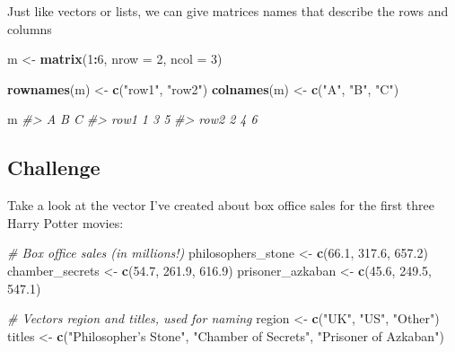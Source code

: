 \documentclass[]{book}
\newenvironment{Shaded}{\begin{snugshade}}{\end{snugshade}}
\newcommand{\KeywordTok}[1]{\textcolor[rgb]{0.13,0.29,0.53}{\textbf{#1}}}
\newcommand{\DataTypeTok}[1]{\textcolor[rgb]{0.13,0.29,0.53}{#1}}
\newcommand{\DecValTok}[1]{\textcolor[rgb]{0.00,0.00,0.81}{#1}}
\newcommand{\FloatTok}[1]{\textcolor[rgb]{0.00,0.00,0.81}{#1}}
\newcommand{\StringTok}[1]{\textcolor[rgb]{0.31,0.60,0.02}{#1}}
\newcommand{\CommentTok}[1]{\textcolor[rgb]{0.56,0.35,0.01}{\textit{#1}}}
\newcommand{\OperatorTok}[1]{\textcolor[rgb]{0.81,0.36,0.00}{\textbf{#1}}}
\newcommand{\NormalTok}[1]{#1}
\begin{document}
Just like vectors or lists, we can give matrices names that describe the
rows and columns

\begin{Shaded}
\begin{Highlighting}[]
\NormalTok{m <-}\StringTok{ }\KeywordTok{matrix}\NormalTok{(}\DecValTok{1}\OperatorTok{:}\DecValTok{6}\NormalTok{, }\DataTypeTok{nrow =} \DecValTok{2}\NormalTok{, }\DataTypeTok{ncol =} \DecValTok{3}\NormalTok{)}

\KeywordTok{rownames}\NormalTok{(m) <-}\StringTok{ }\KeywordTok{c}\NormalTok{(}\StringTok{"row1"}\NormalTok{, }\StringTok{"row2"}\NormalTok{)}
\KeywordTok{colnames}\NormalTok{(m) <-}\StringTok{ }\KeywordTok{c}\NormalTok{(}\StringTok{"A"}\NormalTok{, }\StringTok{"B"}\NormalTok{, }\StringTok{"C"}\NormalTok{)}

\NormalTok{m}
\CommentTok{#>      A B C}
\CommentTok{#> row1 1 3 5}
\CommentTok{#> row2 2 4 6}
\end{Highlighting}
\end{Shaded}

\subsection{Challenge}\label{challenge}

Take a look at the vector I've created about box office sales for the
first three Harry Potter movies:

\begin{Shaded}
\begin{Highlighting}[]
\CommentTok{# Box office sales (in millions!)}
\NormalTok{philosophers_stone <-}\StringTok{ }\KeywordTok{c}\NormalTok{(}\FloatTok{66.1}\NormalTok{, }\FloatTok{317.6}\NormalTok{, }\FloatTok{657.2}\NormalTok{)}
\NormalTok{chamber_secrets <-}\StringTok{ }\KeywordTok{c}\NormalTok{(}\FloatTok{54.7}\NormalTok{, }\FloatTok{261.9}\NormalTok{, }\FloatTok{616.9}\NormalTok{)}
\NormalTok{prisoner_azkaban <-}\StringTok{ }\KeywordTok{c}\NormalTok{(}\FloatTok{45.6}\NormalTok{, }\FloatTok{249.5}\NormalTok{, }\FloatTok{547.1}\NormalTok{)}

\CommentTok{# Vectors region and titles, used for naming}
\NormalTok{region <-}\StringTok{ }\KeywordTok{c}\NormalTok{(}\StringTok{"UK"}\NormalTok{, }\StringTok{"US"}\NormalTok{, }\StringTok{"Other"}\NormalTok{)}
\NormalTok{titles <-}\StringTok{ }\KeywordTok{c}\NormalTok{(}\StringTok{"Philosopher's Stone"}\NormalTok{, }\StringTok{"Chamber of Secrets"}\NormalTok{, }\StringTok{"Prisoner of Azkaban"}\NormalTok{)}
\end{Highlighting}
\end{Shaded}
\end{document}
